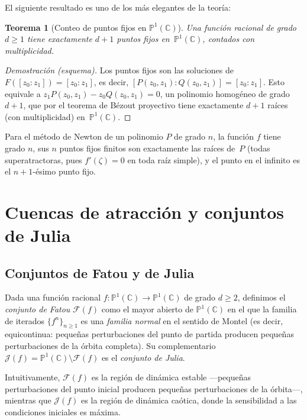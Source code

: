 \documentclass[11pt,a4paper]{article}
\theoremstyle{plain}
\newtheorem{teorema}{Teorema}[section]
\theoremstyle{definition}
\theoremstyle{remark}
\newcommand{\Puno}{\mathbb{P}^1(\mathbb{C})}
\begin{document}
El siguiente resultado es uno de los más elegantes de la teoría:

\begin{teorema}[Conteo de puntos fijos en $\Puno$]
\label{teo:puntosfijos}
Una función racional de grado $d\geq 1$ tiene exactamente $d+1$
puntos fijos en~$\Puno$, contados con multiplicidad.
\end{teorema}

\begin{proof}[Demostración (esquema)]
Los puntos fijos son las soluciones de $F([z_0:z_1])=[z_0:z_1]$,
es decir, $[P(z_0,z_1):Q(z_0,z_1)]=[z_0:z_1]$.
Esto equivale a $z_1 P(z_0,z_1)-z_0 Q(z_0,z_1)=0$, un polinomio
homogéneo de grado $d+1$, que por el teorema de Bézout proyectivo
tiene exactamente $d+1$ raíces (con multiplicidad) en~$\Puno$.
\end{proof}

Para el método de Newton de un polinomio $P$ de grado $n$, la función
$f$ tiene grado $n$, sus $n$ puntos fijos finitos son exactamente
las raíces de~$P$ (todas superatractoras, pues $f'(\zeta)=0$ en toda
raíz simple), y el punto en el infinito es el $n+1$-ésimo punto fijo.

\section{Cuencas de atracción y conjuntos de Julia}
\label{sec:cuencas}

\subsection{Conjuntos de Fatou y de Julia}
\label{ssec:julia}

Dada una función racional $f:\Puno\to\Puno$ de grado $d\geq 2$,
definimos el \emph{conjunto de Fatou} $\mathcal{F}(f)$ como el mayor
abierto de $\Puno$ en el que la familia de iterados
$\{f^n\}_{n\geq 1}$ es una \emph{familia normal} en el sentido de Montel (es decir, equicontinua: pequeñas perturbaciones del punto de partida producen pequeñas perturbaciones de la órbita completa).
Su complementario $\mathcal{J}(f)=\Puno\setminus\mathcal{F}(f)$ es el
\emph{conjunto de Julia}.

Intuitivamente, $\mathcal{F}(f)$ es la región de dinámica estable
—pequeñas perturbaciones del punto inicial producen pequeñas
perturbaciones de la órbita—, mientras que $\mathcal{J}(f)$ es la
región de dinámica caótica, donde la sensibilidad a las condiciones
iniciales es máxima.
\end{document}
